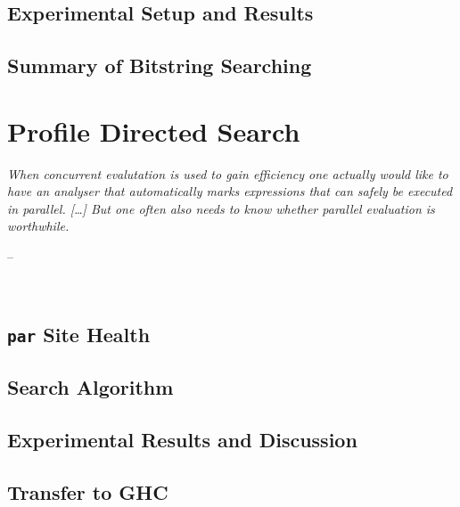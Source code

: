\documentclass[openright, dottedtoc, headinclude, footinclude=true, a4paper, numbers=noenddot]{scrreprt}
\makeatletter
\newenvironment{chapquote}[2][2em]
  {\setlength{\@tempdima}{#1}%
   \def\chapquote@author{#2}%
   \parshape 1 \@tempdima \dimexpr\textwidth-2\@tempdima\relax%
   \itshape}
  {\par\normalfont\hfill--\ \chapquote@author\hspace*{\@tempdima}\par\noindent\hrulefill\\[1cm]}
\makeatother
\begin{document}
        \section{Experimental Setup and Results}
        \label{sec:blind-Results}
        
    
        \section{Summary of Bitstring Searching}
        \label{sec:blind-Conclusion}
        
    
    \chapter{Profile Directed Search}
    \label{chap:prof-search}
    \begin{chapquote}{\cite{dutchBook}}
    When concurrent evalutation is used to gain efficiency one actually would
    like to have an analyser that \emph{automatically} marks expressions that
    can safely be executed in parallel. [\dots] But one often also needs to know whether parallel evaluation
    is \emph{worthwhile}.
    \end{chapquote}
    

        \section{\texttt{par} Site Health}
        \label{sec:parHealth}
        

        \section{Search Algorithm}
        \label{sec:search1}
        
    
        \section{Experimental Results and Discussion}
        \label{sec:infResults}
        

        \section{Transfer to GHC}
        \label{sec:ghcComp}
        
\end{document}

